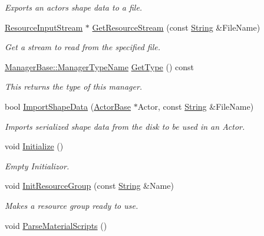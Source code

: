 \begin{DoxyCompactItemize}
\begin{DoxyCompactList}\small\item\em Exports an actors shape data to a file. \item\end{DoxyCompactList}\item 
\hyperlink{classphys_1_1ResourceInputStream}{ResourceInputStream} $\ast$ \hyperlink{classphys_1_1ResourceManager_a13f0aef080b9a353fe6c910c2781de50}{GetResourceStream} (const \hyperlink{namespacephys_aa03900411993de7fbfec4789bc1d392e}{String} \&FileName)
\begin{DoxyCompactList}\small\item\em Get a stream to read from the specified file. \item\end{DoxyCompactList}\item 
\hyperlink{classphys_1_1ManagerBase_aaa6ccddf23892eaccb898529414f80a5}{ManagerBase::ManagerTypeName} \hyperlink{classphys_1_1ResourceManager_a9e5468e5428f5c108c7b3c01e94eba46}{GetType} () const 
\begin{DoxyCompactList}\small\item\em This returns the type of this manager. \item\end{DoxyCompactList}\item 
bool \hyperlink{classphys_1_1ResourceManager_a6fb3434f5d7be221e7a474765c625ad9}{ImportShapeData} (\hyperlink{classphys_1_1ActorBase}{ActorBase} $\ast$Actor, const \hyperlink{namespacephys_aa03900411993de7fbfec4789bc1d392e}{String} \&FileName)
\begin{DoxyCompactList}\small\item\em Imports serialized shape data from the disk to be used in an Actor. \item\end{DoxyCompactList}\item 
void \hyperlink{classphys_1_1ResourceManager_a9be3250f1f1153c9e079f82736eb00a8}{Initialize} ()
\begin{DoxyCompactList}\small\item\em Empty Initializor. \item\end{DoxyCompactList}\item 
void \hyperlink{classphys_1_1ResourceManager_aa2f44129dfc3dc0b0ee332a2bba6078d}{InitResourceGroup} (const \hyperlink{namespacephys_aa03900411993de7fbfec4789bc1d392e}{String} \&Name)
\begin{DoxyCompactList}\small\item\em Makes a resource group ready to use. \item\end{DoxyCompactList}\item 
\hypertarget{classphys_1_1ResourceManager_a348f333ffd9638decd144bf9d65ca05d}{
void \hyperlink{classphys_1_1ResourceManager_a348f333ffd9638decd144bf9d65ca05d}{ParseMaterialScripts} ()}
\label{classphys_1_1ResourceManager_a348f333ffd9638decd144bf9d65ca05d}


\end{DoxyCompactItemize}
